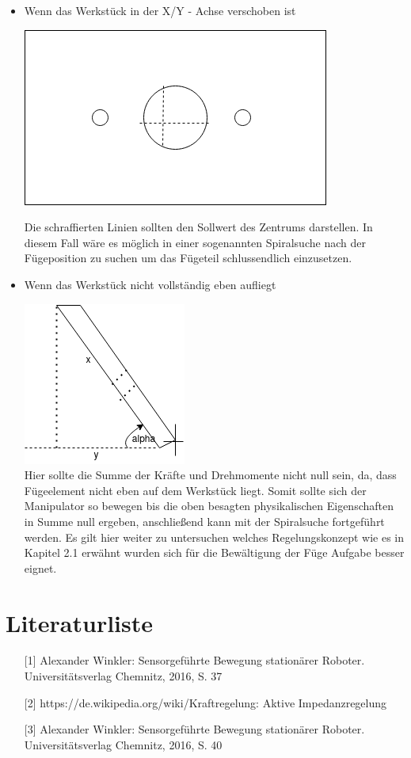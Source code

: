 \documentclass[12pt]{article}
\begin{document}
\begin{itemize}
\item
Wenn das Werkstück in der X/Y - Achse verschoben ist
\begin{center}
\includegraphics[scale=0.5]{img/verschobenes_werkstueck}\\
\end{center}

Die schraffierten Linien sollten den Sollwert des Zentrums darstellen. In diesem Fall wäre es möglich
in einer sogenannten Spiralsuche nach der Fügeposition zu suchen um das Fügeteil schlussendlich einzusetzen.
\newpage
\item 
Wenn das Werkstück nicht vollständig eben aufliegt

\includegraphics[scale=0.8]{img/winkel_werkstueck}\\

Hier sollte die Summe der Kräfte und Drehmomente nicht null sein, da, dass Fügeelement nicht eben auf dem Werkstück liegt. Somit sollte sich der Manipulator so bewegen bis die oben besagten physikalischen Eigenschaften in Summe null ergeben, anschließend kann mit der Spiralsuche fortgeführt werden. Es gilt hier weiter zu untersuchen welches Regelungskonzept wie es in Kapitel 2.1 erwähnt wurden sich für die Bewältigung der Füge Aufgabe besser eignet.
\end{itemize}


\section{Literaturliste}
\begin{itemize}
\item[] [1] Alexander Winkler: Sensorgeführte Bewegung stationärer Roboter. Universitätsverlag Chemnitz, 2016, S. 37
\item[] [2] https://de.wikipedia.org/wiki/Kraftregelung: Aktive Impedanzregelung
\item[] [3] Alexander Winkler: Sensorgeführte Bewegung stationärer Roboter. Universitätsverlag Chemnitz, 2016, S. 40
\end{itemize}
\end{document}
